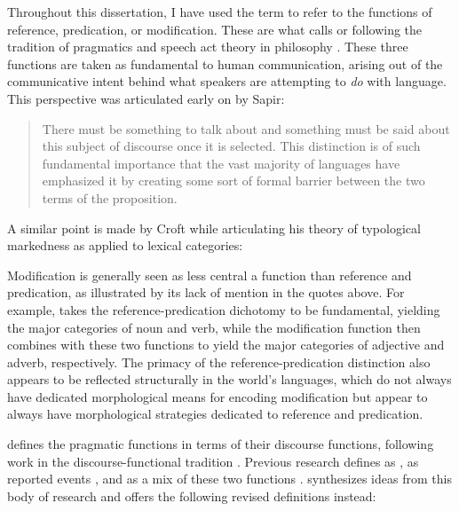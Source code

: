 Throughout this dissertation, I have used the term  to refer to the functions of reference, predication, or modification. These are what \textcite[51]{Croft1991} calls  or  following the tradition of pragmatics and speech act theory in philosophy \parencites{Austin1962}{Searle1969}. These three functions are taken as fundamental to human communication, arising out of the communicative intent behind what speakers are attempting to \emph{do} with language. This perspective was articulated early on by Sapir:

\blockquote[{\cite[87]{Sapir1921}}]{There must be something to talk about and something must be said about this subject of discourse once it is selected. This distinction is of such fundamental importance that the vast majority of languages have emphasized it by creating some sort of formal barrier between the two terms of the proposition.}

\noindent A similar point is made by Croft while articulating his theory of typological markedness as applied to lexical categories: 

Modification is generally seen as less central a function than reference and predication, as illustrated by its lack of mention in the quotes above. For example, \textcite[55]{Hengeveld1992} takes the reference-predication dichotomy to be fundamental, yielding the major categories of noun and verb, while the modification function then combines with these two functions to yield the major categories of adjective and adverb, respectively. The primacy of the reference-predication distinction also appears to be reflected structurally in the world's languages, which do not always have dedicated morphological means for encoding modification but appear to always have morphological strategies dedicated to reference and predication.

\textcite[123]{Croft1991} defines the pragmatic functions in terms of their discourse functions, following work in the discourse-functional tradition \parencites{Chafe1976}{HopperThompson1984}{Chafe1987}{DuBois1987}. Previous research defines  as ,  as reported events \parencite[726]{HopperThompson1984}, and  as a mix of these two functions \parencite{Thompson1989}. \textcite[123]{Croft1991} synthesizes ideas from this body of research and offers the following revised definitions instead:

